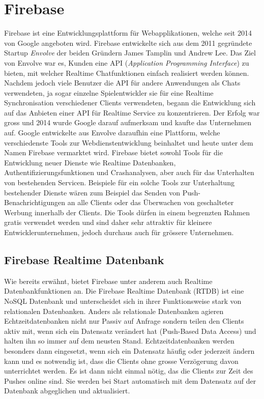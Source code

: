 \documentclass[a4paper,11pt]{report}
\begin{document}
			\section{Firebase} \label{fb}
			Firebase ist eine  Entwicklungsplattform für Webapplikationen, welche seit 2014 von Google angeboten wird. Firebase entwickelte sich aus dem 2011 gegründete Startup \emph{Envolve} der beiden Gründern James Tamplin und Andrew Lee. Das Ziel von Envolve war es, Kunden eine API (\emph{Application Programming Interface}) zu bieten, mit welcher Realtime Chatfunktionen einfach realisiert werden können. Nachdem jedoch viele Benutzer die API für andere Anwendungen als Chats verwendeten, ja sogar einzelne Spielentwickler sie für eine Realtime Synchronisation verschiedener Clients verwendeten, begann die Entwicklung sich auf das Anbieten einer API für Realtime Service zu konzentrieren. Der Erfolg war gross und 2014 wurde Google darauf aufmerksam und kaufte das Unternehmen auf. Google entwickelte aus Envolve daraufhin eine Plattform, welche verschiedenste Tools zur Webdienstentwicklung beinhaltet und heute unter dem Namen Firebase vermarktet wird. Firebase bietet sowohl Tools für die Entwicklung neuer Dienste wie Realtime Datenbanken, Authentifizierungsfunktionen und Crashanalysen, aber auch für das Unterhalten von bestehenden Servicen. Beispiele für ein solche Tools zur Unterhaltung bestehender Dienste wären zum Beispiel das Senden von Push-Benachrichtigungen an alle Clients oder das Überwachen von geschalteter Werbung innerhalb der Clients. Die Tools dürfen in einem begrenzten Rahmen gratis verwendet werden und sind daher sehr attraktiv für kleinere Entwicklerunternehmen, jedoch durchaus auch für grössere Unternehmen.\cite{Firebase}
				
				\subsection{Firebase Realtime Datenbank} \label{realtime}
				Wie bereits erwähnt, bietet Firebase unter anderem auch Realtime Datenbankfunktionen an. Die Firebase Realtime Datenbank (RTDB) ist eine NoSQL Datenbank und unterscheidet sich in ihrer Funktionsweise stark von relationalen Datenbanken. Anders als relationale Datenbanken agieren Echtzeitdatenbanken nicht nur Passiv auf Anfrage sondern teilen den Clients aktiv mit, wenn sich ein Datensatz verändert hat (Push-Based Data Access) und halten ihn so immer auf dem neusten Stand. Echtzeitdatenbanken werden besonders dann eingesetzt, wenn sich ein Datensatz häufig oder jederzeit ändern kann und es notwendig ist, dass die Clients ohne grosse Verzögerung davon unterrichtet werden.\cite{RealtimeDatabase} Es ist dann nicht einmal nötig, das die Clients zur Zeit des Pushes online sind. Sie werden bei Start automatisch mit dem Datensatz auf der Datenbank abgeglichen und aktualisiert.\cite{FirebaseRTDB}
				
\end{document}
